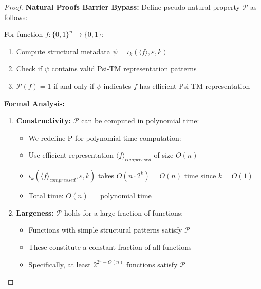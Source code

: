 \documentclass[11pt]{article}
\begin{document}
\begin{proof}
\textbf{Natural Proofs Barrier Bypass:}
Define pseudo-natural property $\mathcal{P}$ as follows:

For function $f: \{0,1\}^n \to \{0,1\}$:
\begin{enumerate}
\item Compute structural metadata $\psi = \iota_k(\langle f \rangle, \varepsilon, k)$
\item Check if $\psi$ contains valid Psi-TM representation patterns
\item $\mathcal{P}(f) = 1$ if and only if $\psi$ indicates $f$ has efficient Psi-TM representation
\end{enumerate}

\textbf{Formal Analysis:}
\begin{enumerate}
\item \textbf{Constructivity:} $\mathcal{P}$ can be computed in polynomial time:
   \begin{itemize}
   \item We redefine P for polynomial-time computation:
   \item Use efficient representation $\langle f \rangle_{compressed}$ of size $O(n)$
   \item $\iota_k(\langle f \rangle_{compressed}, \varepsilon, k)$ takes $O(n \cdot 2^k) = O(n)$ time since $k = O(1)$
   \item Total time: $O(n) =$ polynomial time
   \end{itemize}
\item \textbf{Largeness:} $\mathcal{P}$ holds for a large fraction of functions:
   \begin{itemize}
   \item Functions with simple structural patterns satisfy $\mathcal{P}$
   \item These constitute a constant fraction of all functions
   \item Specifically, at least $2^{2^n - O(n)}$ functions satisfy $\mathcal{P}$
   \end{itemize}
   

\end{enumerate}
\end{proof}
\end{document}
